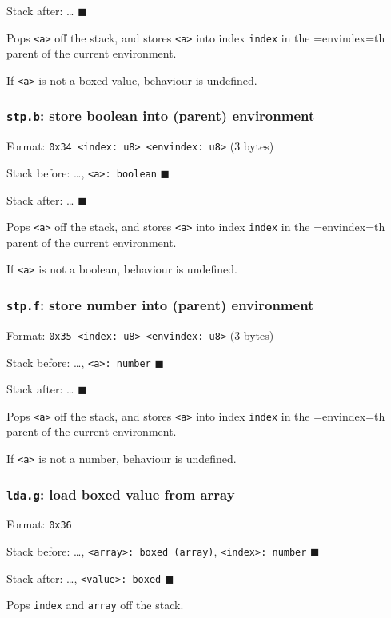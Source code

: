 Stack after: \ldots{} \(\blacksquare\)

Pops \texttt{<a>} off the stack, and stores \texttt{<a>} into index \texttt{index} in the
=envindex=th parent of the current environment.

If \texttt{<a>} is not a boxed value, behaviour is undefined.

\subsubsection{\texttt{stp.b}: store boolean into (parent) environment}
\label{sec:org15feb28}
Format: \texttt{0x34 <index: u8> <envindex: u8>} (3 bytes)

Stack before: \ldots{}, \texttt{<a>: boolean} \(\blacksquare\)

Stack after: \ldots{} \(\blacksquare\)

Pops \texttt{<a>} off the stack, and stores \texttt{<a>} into index \texttt{index} in the
=envindex=th parent of the current environment.

If \texttt{<a>} is not a boolean, behaviour is undefined.

\subsubsection{\texttt{stp.f}: store number into (parent) environment}
\label{sec:org4696eef}
Format: \texttt{0x35 <index: u8> <envindex: u8>} (3 bytes)

Stack before: \ldots{}, \texttt{<a>: number} \(\blacksquare\)

Stack after: \ldots{} \(\blacksquare\)

Pops \texttt{<a>} off the stack, and stores \texttt{<a>} into index \texttt{index} in the
=envindex=th parent of the current environment.

If \texttt{<a>} is not a number, behaviour is undefined.

\subsubsection{\texttt{lda.g}: load boxed value from array}
\label{sec:org0b3a1ff}
Format: \texttt{0x36}

Stack before: \ldots{}, \texttt{<array>: boxed (array)}, \texttt{<index>: number} \(\blacksquare\)

Stack after: \ldots{}, \texttt{<value>: boxed} \(\blacksquare\)

Pops \texttt{index} and \texttt{array} off the stack.

